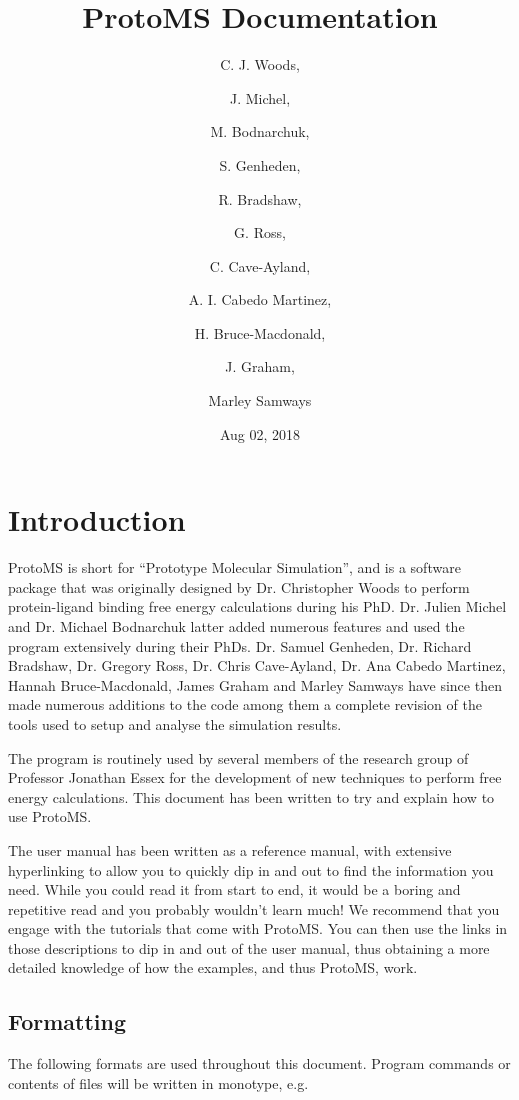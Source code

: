 \documentclass[letterpaper,10pt,english]{sphinxmanual}
\title{ProtoMS Documentation}
\date{Aug 02, 2018}
\author{C. J. Woods, \and J. Michel, \and M. Bodnarchuk, \and S. Genheden, \and R. Bradshaw, \and G. Ross, \and C. Cave-Ayland, \and A. I. Cabedo Martinez, \and H. Bruce-Macdonald, \and J. Graham, \and Marley Samways}
\begin{document}
\maketitle
\sphinxtableofcontents
{}\label{\detokenize{index::doc}}



\chapter{Introduction}
\label{\detokenize{introduction:introduction}}\label{\detokenize{introduction:protoms-documentation}}\label{\detokenize{introduction::doc}}
ProtoMS is short for “Prototype Molecular Simulation”, and is a software package that was originally designed by Dr. Christopher Woods to perform protein-ligand binding free energy calculations during his PhD. Dr. Julien Michel and Dr. Michael Bodnarchuk latter added numerous features and used the program extensively during their PhDs. Dr. Samuel Genheden, Dr. Richard Bradshaw, Dr. Gregory Ross, Dr. Chris Cave-Ayland, Dr. Ana Cabedo Martinez, Hannah Bruce-Macdonald, James Graham and Marley Samways have since then made numerous additions to the code among them a complete revision of the tools used to setup and analyse the simulation results.

The program is routinely used by several members of the research group of Professor Jonathan Essex for the development of new techniques to perform free energy calculations. This document has been written to try and explain how to use ProtoMS.

The user manual has been written as a reference manual, with extensive hyperlinking to allow you to quickly dip in and out to find the information you need. While you could read it from start to end, it would be a boring and repetitive read and you probably wouldn’t learn much! We recommend that you engage with the tutorials that come with ProtoMS. You can then use the links in those descriptions to dip in and out of the user manual, thus obtaining a more detailed knowledge of how the examples, and thus ProtoMS, work.


\section{Formatting}
\label{\detokenize{introduction:formatting}}
The following formats are used throughout this document. Program commands or contents of files will be written in monotype, e.g.

%
\begin{sphinxVerbatim}[commandchars=\\\{\}]
 
\end{sphinxVerbatim}
\end{document}
